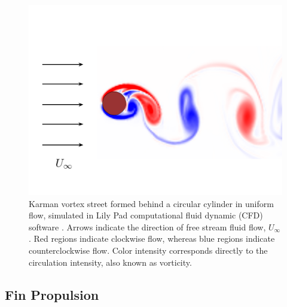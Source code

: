 \begin{figure}
\begin{center}
\includegraphics[width=0.6\columnwidth]{figures/Edited Karman Street.png}
\end{center}
\caption{Karman vortex street formed behind a circular cylinder in uniform flow, simulated in Lily Pad computational fluid dynamic (CFD) software \citep{Weymouth2015}. Arrows indicate the direction of free stream fluid flow, $U_\infty$. Red regions indicate clockwise flow, whereas blue regions indicate counterclockwise flow. Color intensity corresponds directly to the circulation intensity, also known as vorticity.}
\label{fig:app:Karman}
\end{figure}

\subsection{Fin Propulsion} \label{Fin Propulsion}


